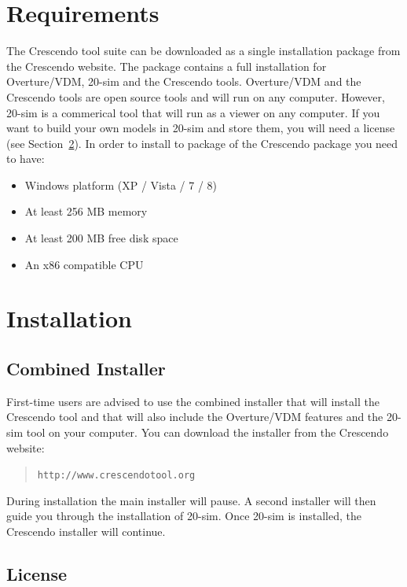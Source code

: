 \documentclass{crescendorepchap}
\newcommand{\url}[1]{\texttt{#1}}
\begin{document}
\section{Requirements}

The Crescendo tool suite can be downloaded as a single installation
package from the Crescendo website. The package contains a
full installation for Overture/VDM, 20-sim and the
Crescendo tools. Overture/VDM and the Crescendo tools are open source tools and
will run on any computer. However, 20-sim is a commerical tool that will run as a
viewer on any computer. If you want to build your own models in 20-sim
and store them, you will need a license (see Section~\ref{sec:install}). In order to install to package of the Crescendo package you need to have:

\begin{itemize}
\item
  Windows platform (XP / Vista / 7 / 8)
\item At least
  256 MB memory
\item At least
  200 MB free disk space
\item An
  x86 compatible CPU
\end{itemize}

\section{Installation}\label{sec:install}

\subsection{Combined Installer}

First-time users are advised to use the combined installer that will
install the Crescendo tool and that will also include the Overture/VDM features and the 20-sim tool on your computer. You can
download the installer from the Crescendo website:

\begin{quote}
\url{http://www.crescendotool.org}
\end{quote}

During installation the main installer will pause. A second installer
will then guide you through the installation of 20-sim. Once 20-sim is
installed, the Crescendo installer will continue.

\subsection{License}
\end{document}
